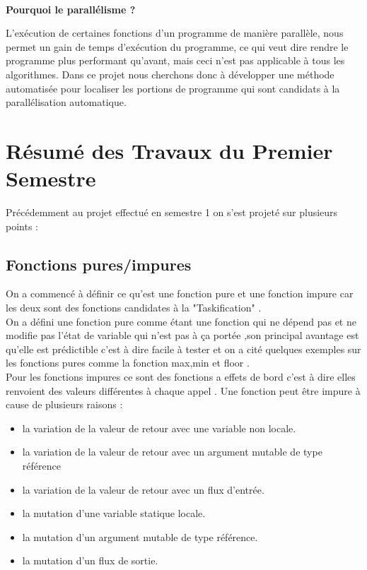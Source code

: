 \documentclass[12pt,a4paper]{article}
\begin{document}
\paragraph{}\textbf{Pourquoi le parallélisme ?}

 L’exécution de  certaines fonctions d'un programme de manière parallèle, nous permet un gain de temps d'exécution du programme, ce qui veut dire rendre le programme plus performant qu'avant, mais ceci n'est pas applicable à tous les algorithmes. Dans ce projet nous cherchons donc à développer une méthode automatisée pour localiser les portions de programme qui sont candidats à la parallélisation automatique.

\section{Résumé des Travaux du Premier Semestre}

Précédemment au projet effectué en semestre 1 on s'est projeté sur plusieurs points : 

\subsection{Fonctions pures/impures}
On a commencé à définir ce qu'est une fonction pure et une fonction impure car les deux sont des fonctions candidates à la "Taskification" .\\
On a défini une fonction pure comme étant une fonction qui ne dépend pas et ne modifie pas l'état de variable qui n'est pas à ça portée ,son principal avantage est qu'elle est prédictible c'est à dire facile à tester \cite{avantage}  et on a cité quelques exemples sur les fonctions pures comme la fonction max,min et floor .\\
Pour les fonctions impures ce sont des fonctions a effets de bord c'est à dire elles renvoient des valeurs différentes à chaque appel . Une fonction peut être impure à cause de plusieurs raisons \cite{fctimpure}:

    \begin{itemize}
    \item la variation de la valeur de retour avec une variable non locale.
    \item la variation de la valeur de retour avec un argument mutable de type référence
    \item la variation de la valeur de retour avec un flux d’entrée.
    \item la mutation d’une variable statique locale.
    \item la mutation d’un argument mutable de type référence.
    \item la mutation d’un flux de sortie.
\end{itemize}
\end{document}
